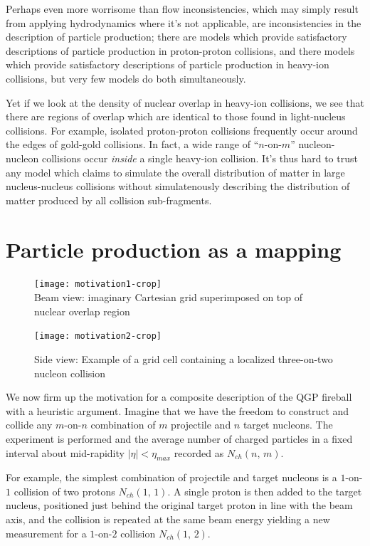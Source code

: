 \documentclass[aps,prc,reprint,amsmath,nofootinbib]{revtex4-1}
\begin{document}
Perhaps even more worrisome than flow inconsistencies, which may simply result from applying hydrodynamics where it's not applicable, are inconsistencies in the description 
of particle production; there are models which provide satisfactory descriptions of particle production in proton-proton collisions, and there models which provide 
satisfactory descriptions of particle production in heavy-ion collisions, but very few models do both simultaneously. 

Yet if we look at the density of nuclear overlap in heavy-ion collisions, we see that there are regions of overlap which are identical to those found in light-nucleus 
collisions. For example, isolated proton-proton collisions frequently occur around the edges of gold-gold collisions. In fact, a wide range of ``$n$-on-$m$'' nucleon-nucleon 
collisions occur \emph{inside} a single heavy-ion collision. It's thus hard to trust any model which claims to simulate the overall distribution of matter in large nucleus-nucleus collisions without simulatenously describing the 
distribution of matter produced by all collision sub-fragments. 

\section{Particle production as a mapping}

\begin{figure}
 \texttt{[image: motivation1-crop]}\\
 \caption{\label{fig:motivation_beam} Beam view: imaginary Cartesian grid superimposed on top of nuclear overlap region}
 \texttt{[image: motivation2-crop]}
 \caption{\label{fig:motivation_side} Side view: Example of a grid cell containing a localized three-on-two nucleon collision}
\end{figure}

We now firm up the motivation for a composite description of the QGP fireball with a heuristic argument. Imagine that we have the freedom to construct and collide any 
$m$-on-$n$ combination of $m$ projectile and $n$ target nucleons. The experiment is performed and the average number of charged particles in a fixed interval about 
mid-rapidity $|\eta|< \eta_{max}$ recorded as $N_{ch}(n,\, m)$.

For example, the simplest combination of projectile and target nucleons is a $1$-on-$1$ collision of two protons $N_{ch}(1,\, 1)$. A single proton is then added to the 
target nucleus, positioned just behind the original target proton in line with the beam axis, and the collision is repeated at the 
same beam energy yielding a new measurement for a $1$-on-$2$ collision $N_{ch}(1,\, 2)$.
\end{document}
